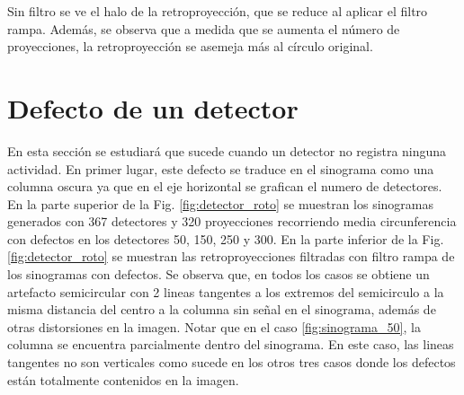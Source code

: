 \documentclass[letterpaper,12pt]{article}
\theoremstyle{plain}
\begin{document}
Sin filtro se ve el halo de la retroproyección, que se reduce al aplicar el filtro rampa. Además, se observa que a medida que se aumenta el número de proyecciones, la retroproyección se asemeja más al círculo original.


\section{Defecto de un detector}

En esta sección se estudiará que sucede cuando un detector no registra ninguna actividad. En primer lugar, este defecto se traduce en el sinograma como una columna oscura ya que en el eje horizontal se grafican el numero de detectores. En la parte superior de la Fig. \ref{fig:detector_roto} se muestran los sinogramas generados con 367 detectores y 320 proyecciones recorriendo media circunferencia con defectos en los detectores 50, 150, 250 y 300. En la parte inferior de la Fig. \ref{fig:detector_roto} se muestran las retroproyecciones filtradas con filtro rampa de los sinogramas con defectos. Se observa que, en todos los casos se obtiene un artefacto semicircular con 2 lineas tangentes a los extremos del semicirculo a la misma distancia del centro a la columna sin señal en el sinograma, además de otras distorsiones en la imagen. Notar que en el caso \ref{fig:sinograma_50}, la columna se encuentra parcialmente dentro del sinograma. En este caso, las lineas tangentes no son verticales como sucede en los otros tres casos donde los defectos están totalmente contenidos en la imagen. 
\end{document}
